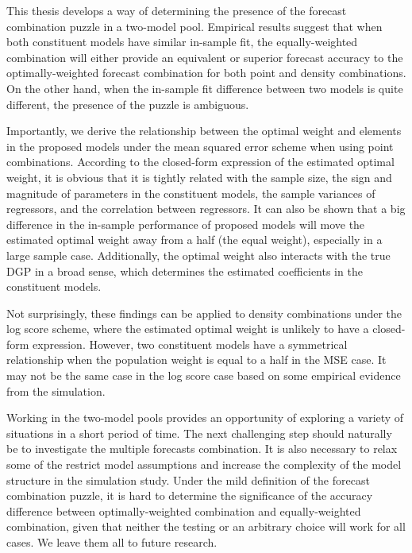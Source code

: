 \documentclass{monashthesis}
\begin{document}
This thesis develops a way of determining the presence of the forecast combination puzzle in a two-model pool. Empirical results suggest that when both constituent models have similar in-sample fit, the equally-weighted combination will either provide an equivalent or superior forecast accuracy to the optimally-weighted forecast combination for both point and density combinations. On the other hand, when the in-sample fit difference between two models is quite different, the presence of the puzzle is ambiguous.

Importantly, we derive the relationship between the optimal weight and elements in the proposed models under the mean squared error scheme when using point combinations. According to the closed-form expression of the estimated optimal weight, it is obvious that it is tightly related with the sample size, the sign and magnitude of parameters in the constituent models, the sample variances of regressors, and the correlation between regressors. It can also be shown that a big difference in the in-sample performance of proposed models will move the estimated optimal weight away from a half (the equal weight), especially in a large sample case. Additionally, the optimal weight also interacts with the true DGP in a broad sense, which determines the estimated coefficients in the constituent models.

Not surprisingly, these findings can be applied to density combinations under the log score scheme, where the estimated optimal weight is unlikely to have a closed-form expression. However, two constituent models have a symmetrical relationship when the population weight is equal to a half in the MSE case. It may not be the same case in the log score case based on some empirical evidence from the simulation.

Working in the two-model pools provides an opportunity of exploring a variety of situations in a short period of time. The next challenging step should naturally be to investigate the multiple forecasts combination. It is also necessary to relax some of the restrict model assumptions and increase the complexity of the model structure in the simulation study. Under the mild definition of the forecast combination puzzle, it is hard to determine the significance of the accuracy difference between optimally-weighted combination and equally-weighted combination, given that neither the testing or an arbitrary choice will work for all cases. We leave them all to future research.

\appendix
\end{document}
